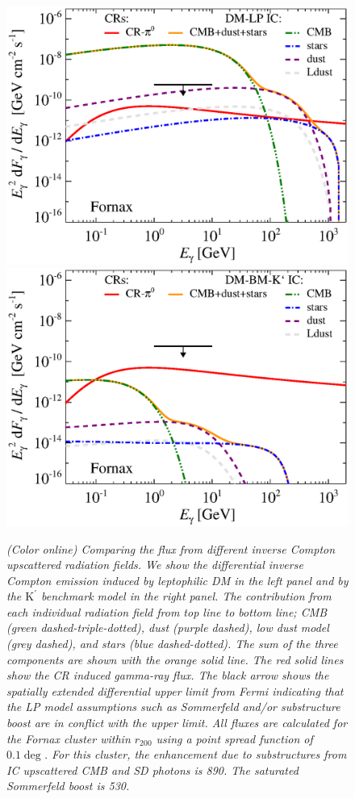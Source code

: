 \documentclass[10pt,aps,pra,reprint,amsmath,amsfonts,amssymb,showpacs,nofootinbib,floatfix]{revtex4-1}
\newcommand{\Fermi}{{\em Fermi}\xspace}
\newcommand{\rmn}{\mathrm}
\newcommand{\Kp}{\rmn{K}^\prime}
\newcommand{\rvir}{r_{200}}
\begin{document}
\begin{figure}
\begin{minipage}{2.0\columnwidth}
\includegraphics[width=0.49\columnwidth]{figures/flux.IRcomp.v14.0.1deg.1.6T.SubMass.elmu.SF700.noMW.woGal.bw.eps}
\includegraphics[width=0.49\columnwidth]{figures/flux.IRcomp.BMv14.0.1deg.SubMass.noMW.woGal.bw.eps}
\caption{\it (Color online) Comparing the flux from different inverse
  Compton upscattered radiation fields. We show the differential
  inverse Compton emission induced by leptophilic DM in the left panel
  and by the $\Kp$ benchmark model in the right panel. The
  contribution from each individual radiation field from top line to
  bottom line; CMB (green dashed-triple-dotted), dust (purple dashed),
  low dust model (grey dashed), and stars (blue dashed-dotted). The
  sum of the three components are shown with the orange solid
  line. The red solid lines show the CR induced gamma-ray flux. The
  black arrow shows the spatially extended differential upper limit
  from \Fermi \protect \cite{2010ApJ...717L..71A} indicating that the
  LP model assumptions such as Sommerfeld and/or substructure boost
  are in conflict with the upper limit. All fluxes are calculated for
  the Fornax cluster within $\rvir$ using a point spread function of
  $0.1\deg$. For this cluster, the enhancement due to substructures
  from IC upscattered CMB and SD photons is 890. The saturated
  Sommerfeld boost is 530.}
 \label{fig:IR_comp}
\end{minipage}
\end{figure}
\end{document}
